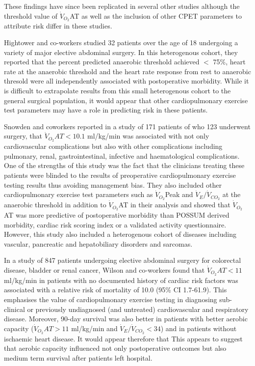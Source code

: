 These findings have since been replicated in several other studies although the threshold value of $\dot{V}_{O_2}$AT as well as the inclusion of other CPET parameters to attribute risk differ in these studies.

Hightower and co-workers studied 32 patients over the age of 18 undergoing a variety of major elective abdominal surgery. In this heterogenous cohort, they reported that the percent predicted anaerobic threshold achieved $<$ 75\%, heart rate at the anaerobic threshold and the heart rate response from rest to anaerobic thresold were all independently associated with postoperative morbidity. While it is difficult to extrapolate results from this small heterogenous cohort to the general surgical population, it would appear that other cardiopulmonary exercise test parameters may have a role in predicting risk in these patients.\parencite{hightower_pilot_2010}

Snowden and coworkers reported in a study of 171 patients of who 123 underwent surgery, that $\dot{V}_{O_2}AT<10.1$ ml/kg/min was associated with not only cardiovascular complications but also with other complications including pulmonary, renal, gastrointestinal, infective and haematological complications. One of the strengths of this study was the fact that the clinicians treating these patients were blinded to the results of preoperative cardiopulmonary exercise testing results thus avoiding management bias. They also included other cardiopulmonary exercise test parameters such as $\dot{V}_{O_2}$Peak and $\dot{V}_E/\dot{V}_{CO_2}$ at the anaerobic threshold in addition to $\dot{V}_{O_2}$AT in their analysis and showed that $\dot{V}_{O_2}$AT was more predictive of postoperative morbidity than POSSUM derived morbidity, cardiac risk scoring index or a validated activity questionnaire. However, this study also included a heterogenous cohort of diseases including vascular, pancreatic and hepatobiliary disorders and sarcomas.\parencite{snowden_submaximal_2010}

In a study of 847 patients undergoing elective abdominal surgery for colorectal disease, bladder or renal cancer, Wilson and co-workers found that $\dot{V}_{O_2}AT<11$ ml/kg/min in patients with no documented history of cardiac risk factors was associated with a relative risk of mortality of 10.0 (95\% CI 1.7-61.9). This emphasises the value of cardiopulmonary exercise testing in diagnosing sub-clinical or previously undiagnosed (and untreated) cardiovascular and respiratory disease. Moreover, 90-day survival was also better in patients with better aerobic capacity ($\dot{V}_{O_2}AT>11$ ml/kg/min and $\dot{V}_E/\dot{V}_{CO_2}<34$) and in patients without ischaemic heart disease. It would appear therefore that This appears to suggest that aerobic capacity influenced not only postoperative outcomes but also medium term survival after patients left hospital.\parencite{wilson_impaired_2010}


